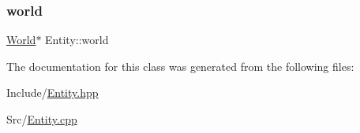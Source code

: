 \subsubsection{\texorpdfstring{world}{world}}
{\footnotesize\ttfamily \mbox{\hyperlink{class_world}{World}}$\ast$ Entity\+::world\hspace{0.3cm}{\ttfamily [protected]}}



The documentation for this class was generated from the following files\+:\begin{DoxyCompactItemize}
\item 
Include/\mbox{\hyperlink{_entity_8hpp}{Entity.\+hpp}}\item 
Src/\mbox{\hyperlink{_entity_8cpp}{Entity.\+cpp}}\end{DoxyCompactItemize}
